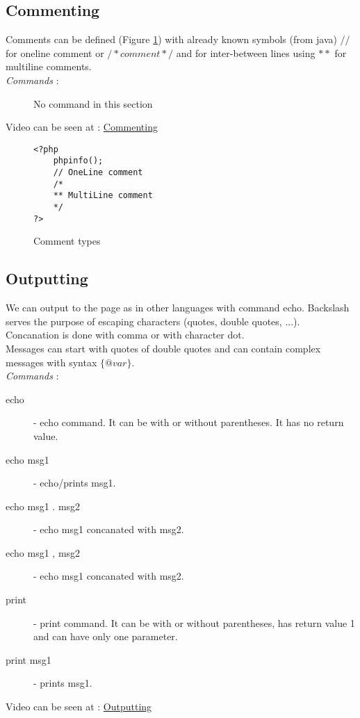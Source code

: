\documentclass{article}
\begin{document}
\subsection{Commenting}
Comments can be defined (Figure \hyperref[commenting]{\ref{commenting}}) with already known symbols (from java) $//$ for oneline comment or $/* comment */$ and for inter-between lines using $**$ for multiline comments.  \\
\textit{Commands} : 
\begin{description}
\item[\hspace{1cm}] No command in this section
\end{description}
Video can be seen at : \href{http://youtu.be/KZecj4u4Scw}{Commenting}

\begin{figure}[H]
\lstset{language=PHP}
\begin{lstlisting}
<?php
	phpinfo();
	// OneLine comment
	/*
	** MultiLine comment
	*/	
?>
\end{lstlisting}
\caption{Comment types \label{commenting}}
\end{figure}

\subsection{Outputting}
We can output to the page as in other languages with command echo. Backslash serves 
the purpose of escaping characters (quotes, double quotes, ...). Concanation is done
with comma or with character dot.\\
Messages can start with quotes of double quotes and can contain
complex messages with syntax $\{@var\}$. \\
\textit{Commands} : 
\begin{description}
\item[\hspace{1cm} echo] - echo command. It can be with or without parentheses. It has no return value.
\item[\hspace{1cm} echo msg1] - echo/prints msg1.
\item[\hspace{1cm} echo msg1 . msg2] - echo msg1 concanated with msg2.
\item[\hspace{1cm} echo msg1 , msg2] - echo msg1 concanated with msg2.
\item[\hspace{1cm} print] - print command. It can be with or without parentheses, has return value 1 and can have only one parameter.
\item[\hspace{1cm} print msg1] - prints msg1. 
\end{description}
Video can be seen at : \href{http://youtu.be/ZbRG9KQBbts}{Outputting}
\end{document}
